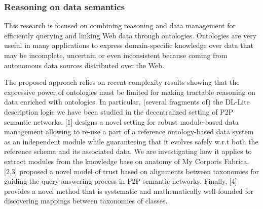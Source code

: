 \subsubsection{Reasoning on data semantics}

This research is focused on combining reasoning and data management for efficiently querying and linking Web data through ontologies. Ontologies are very useful in many applications to express domain-specific knowledge over data that may be incomplete, uncertain or even inconsistent because coming from autonomous data sources distributed over the Web. 

The proposed approach relies on recent complexity  results showing that the expressive power of ontologies must be limited for making tractable reasoning on data enriched with ontologies. In particular,  (several fragments of) the DL-Lite description logic  we have been studied  in the decentralized setting of P2P semantic networks. [1] designs a novel setting for robust module-based data management allowing to re-use a part of a  reference ontology-based data system as an independent module while guaranteeing that it evolves safely w.r.t both the reference  schema and its associated data. We are investigating how it applies to extract modules from the knowledge base on anatomy of My Corporis Fabrica.  [2,3]  proposed a novel model of trust based on alignments between taxonomies for guiding the query answering process in P2P semantic networks. Finally,  [4]  provides a novel method that is systematic and mathematically well-founded for discovering mappings between taxonomies of classes. 


